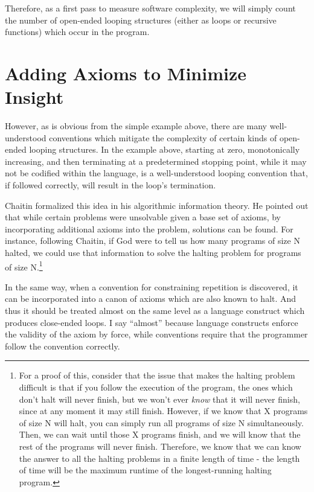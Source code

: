 Therefore, as a first pass to measure software complexity, we will simply count the number of open-ended looping structures (either as loops or recursive functions) which occur in the program.   

\section{Adding Axioms to Minimize Insight}

However, as is obvious from the simple example above, there are many well-understood conventions which mitigate the complexity of certain kinds of open-ended looping structures.  In the example above, starting at zero, monotonically increasing, and then terminating at a predetermined stopping point, while it may not be codified within the language, is a well-understood looping convention that, if followed correctly, will result in the loop’s termination.

Chaitin formalized this idea in his algorithmic information theory.  He pointed out that while certain problems were unsolvable given a base set of axioms, by incorporating additional axioms into the problem, solutions can be found.  For instance, following Chaitin, if God were to tell us how many programs of size N halted, we could use that information to solve the halting problem for programs of size N.\cite{chaitin}\footnote{For a proof of this, consider that the issue that makes the halting problem difficult is that if you follow the execution of the program, the ones which don’t halt will never finish, but we won’t ever \emph{know} that it will never finish, since at any moment it may still finish.  However, if we know that X programs of size N will halt, you can simply run all programs of size N simultaneously.  Then, we can wait until those X programs finish, and we will know that the rest of the programs will never finish.  Therefore, we know that we can know the answer to all the halting problems in a finite length of time - the length of time will be the maximum runtime of the longest-running halting program.}

In the same way, when a convention for constraining repetition is discovered, it can be incorporated into a canon of axioms which are also known to halt.  And thus it should be treated almost on the same level as a language construct which produces close-ended loops.  I say ``almost'' because language constructs enforce the validity of the axiom by force, while conventions require that the programmer follow the convention correctly.

